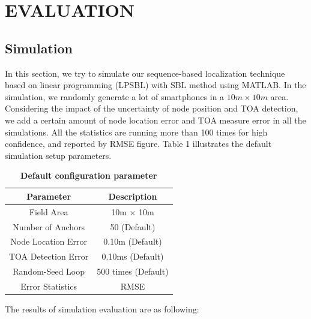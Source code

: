 \section{EVALUATION }
\label{section:results}

\subsection{Simulation}
In this section, we try to simulate our sequence-based localization technique based on linear programming (LPSBL) with SBL method using MATLAB. 
In the simulation, we randomly generate a lot of smartphones in a $10m \times 10m$ area. 
Considering the impact of the uncertainty of node position and TOA detection, we add a certain amount of node location error and TOA measure error in all the simulations.
All the statistics are running more than 100 times for high confidence, and reported by RMSE figure. Table 1 illustrates the default simulation setup parameters.

\begin{table} \normalsize
\caption {\textbf{Default configuration parameter}} %
\centering %
    \begin{tabular}{|c|c|}
        \hline
Parameter & Description \\
 \hline
Field Area & 10m $\times$ 10m \\
\hline
Number of Anchors & 50 (Default) \\
 \hline
Node Location Error 	 & 0.10m (Default) \\
 \hline
TOA Detection Error 	 & 0.10ms (Default) \\
 \hline
Random-Seed Loop	 & 500 times (Default) \\
 \hline
Error Statistics	 &  RMSE \\
        \hline
    \end{tabular}
\end{table}



The results of simulation evaluation are as following:


